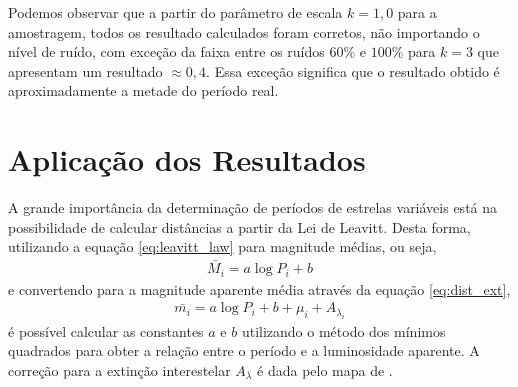 


Podemos observar que a partir do parâmetro de escala $k=1,0$ para a amostragem, todos os resultado calculados foram corretos, não importando o nível de ruído, com exceção da faixa entre os ruídos $60\%$ e $100\%$ para $k=3$ que apresentam um resultado $\approx 0,4$. Essa exceção significa que o resultado obtido é aproximadamente a metade do período real.



\section{Aplicação dos Resultados}

A grande importância da determinação de períodos de estrelas variáveis está na possibilidade de calcular distâncias a partir da Lei de Leavitt. Desta forma, utilizando a equação \ref{eq:leavitt_law} para magnitude médias, ou seja,
\begin{align}
\bar{M_i} = a \log P_i + b
\end{align}
e convertendo para a magnitude aparente média através da equação \ref{eq:dist_ext}, %
\begin{align}
\bar{m_i} = a \log P_i + b + \mu_i + A_{\lambda_i} \label{eq:cap4_pl}
\end{align}
é possível calcular as constantes $a$ e $b$ utilizando o método dos mínimos quadrados para obter a relação entre o período e a luminosidade aparente. A correção para a extinção interestelar $A_\lambda$ é dada pelo mapa de \citet{Pejcha2009}.


